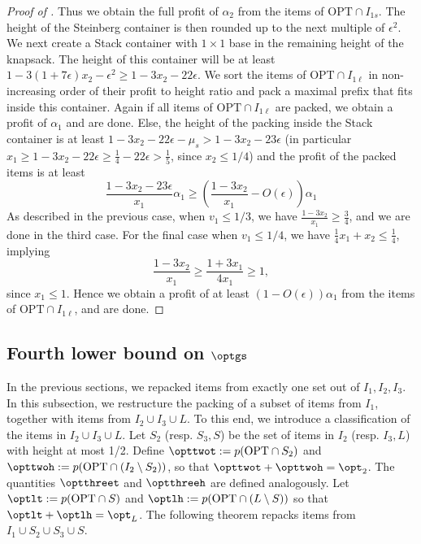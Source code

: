 \begin{proof}[Proof of ]
    Thus we obtain the full profit of $\alpha_2$ from the items of $\text{OPT}\cap I_{1s}$. The height of the Steinberg container is then rounded up to the next multiple of $\epsilon^2$. We next create a Stack container with $1\times 1$ base in the remaining height of the knapsack. The height of this container will be at least $1-3(1+7\epsilon)x_2-\epsilon^2 \ge 1-3x_2-22\epsilon$. We sort the items of $\text{OPT}\cap I_{1\ell}$ in non-increasing order of their profit to height ratio and pack a maximal prefix that fits inside this container. Again if all items of $\text{OPT}\cap I_{1\ell}$ are packed, we obtain a profit of $\alpha_1$ and are done. Else, the height of the packing inside the Stack container is at least $1-3x_2-22\epsilon-\mu_s > 1-3x_2-23\epsilon$ (in particular $x_1\ge 1-3x_2-22\epsilon  \ge \frac{1}{4}-22\epsilon>\frac{1}{5}$, since $x_2\le 1/4$) and the profit of the packed items is at least
    \[ \frac{1-3x_2-23\epsilon}{x_1}\alpha_1 \ge \left(\frac{1-3x_2}{x_1}-O(\epsilon)\right)\alpha_1\]
    As described in the previous case, when $v_1\le 1/3$, we have $\frac{1-3x_2}{x_1}\ge \frac{3}{4}$, and we are done in the third case. For the final case when $v_1 \le 1/4$, we have $\frac{1}{4}x_1+x_2 \le \frac{1}{4}$, implying
    \[ \frac{1-3x_2}{x_1} \ge \frac{1+3x_1}{4x_1}\ge 1,\]
    since $x_1 \le 1$. Hence we obtain a profit of at least $(1-O(\epsilon))\alpha_1$ from the items of $\text{OPT}\cap I_{1\ell}$, and are done.    
\end{proof}
\fi


\subsection{Fourth lower bound on \texorpdfstring{$\optgs$}{optgs}}
\label{sec:fourthlb}
In the previous sections, we repacked items from exactly one set out of $I_1, I_2, I_3$. In this subsection, we restructure the packing of a subset of items from $I_1$, together with items from $I_2\cup I_3\cup L$. To this end, we introduce a classification of the items in $I_2\cup I_3\cup L$. 
Let $S_2$ (resp. $S_3,S$) be the set of items in $I_2$ (resp. $I_3,L$) with height at most 1/2. Define $\opttwot := p(\text{OPT}\cap S_2)$ and $\opttwoh := p(\text{OPT}\cap (I_2\setminus S_2))$, so that $\opttwot+\opttwoh = \opt_2$. The quantities $\optthreet$ and $\optthreeh$ are defined analogously. Let $\optlt := p(\text{OPT}\cap S)$ and $\optlh := p(\text{OPT}\cap (L\setminus S))$ so that $\optlt+\optlh = \opt_L$. The following theorem repacks items from $I_1\cup S_2\cup S_3\cup S$.


